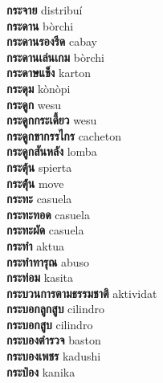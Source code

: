 \textbf{ กระจาย  } distribuí \\
\textbf{ กระดาน  } bòrchi \\
\textbf{ กระดานรองรีด  } cabay \\
\textbf{ กระดานเล่นเกม  } bòrchi \\
\textbf{ กระดาษแข็ง  } karton \\
\textbf{ กระดุม  } kònòpi \\
\textbf{ กระดูก  } wesu \\
\textbf{ กระดูกกระเดี้ยว  } wesu \\
\textbf{ กระดูกขากรรไกร  } cacheton \\
\textbf{ กระดูกสันหลัง  } lomba \\
\textbf{ กระตุ้น  } spierta \\
\textbf{ กระตุ้่น  } move \\
\textbf{ กระทะ  } casuela \\
\textbf{ กระทะทอด  } casuela \\
\textbf{ กระทะผัด  } casuela \\
\textbf{ กระทำ  } aktua \\
\textbf{ กระทำทารุณ  } abuso \\
\textbf{ กระท่อม  } kasita \\
\textbf{ กระบวนการตามธรรมชาติ  } aktividat \\
\textbf{ กระบอกลูกสูบ  } cilindro \\
\textbf{ กระบอกสูบ  } cilindro \\
\textbf{ กระบองตำรวจ  } baston \\
\textbf{ กระบองเพชร  } kadushi \\
\textbf{ กระป๋อง  } kanika \\
